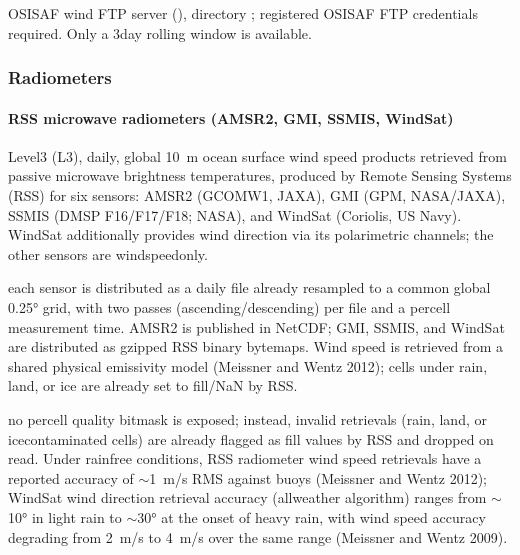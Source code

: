 \documentclass[a4paper,10pt,english]{sphinxmanual}
\begin{document}
\sphinxAtStartPar
{}

\sphinxAtStartPar
OSI\sphinxhyphen{}SAF wind FTP server (), directory ; registered OSI\sphinxhyphen{}SAF FTP credentials required. Only a 3\sphinxhyphen{}day rolling window is available.


\subsubsection{Radiometers}
\label{\detokenize{05_reference_datasets:radiometers}}

\paragraph{RSS microwave radiometers (AMSR2, GMI, SSMIS, WindSat)}
\label{\detokenize{05_reference_datasets:rss-microwave-radiometers-amsr2-gmi-ssmis-windsat}}
\sphinxAtStartPar
{}

\sphinxAtStartPar
Level\sphinxhyphen{}3 (L3), daily, global 10 m ocean surface wind speed products retrieved from passive microwave brightness temperatures, produced by Remote Sensing Systems (RSS) for six sensors: AMSR2 (GCOM\sphinxhyphen{}W1, JAXA), GMI (GPM, NASA/JAXA), SSMIS (DMSP F16/F17/F18; NASA), and WindSat (Coriolis, US Navy). WindSat additionally provides wind direction via its polarimetric channels; the other sensors are wind\sphinxhyphen{}speed\sphinxhyphen{}only.

\sphinxAtStartPar
{}

\sphinxAtStartPar
each sensor is distributed as a daily file already resampled to a common global 0.25° grid, with two passes (ascending/descending) per file and a per\sphinxhyphen{}cell measurement time. AMSR2 is published in NetCDF; GMI, SSMIS, and WindSat are distributed as gzipped RSS binary bytemaps. Wind speed is retrieved from a shared physical emissivity model (Meissner and Wentz 2012); cells under rain, land, or ice are already set to fill/NaN by RSS.

\sphinxAtStartPar
{}

\sphinxAtStartPar
no per\sphinxhyphen{}cell quality bitmask is exposed; instead, invalid retrievals (rain\sphinxhyphen{}, land\sphinxhyphen{}, or ice\sphinxhyphen{}contaminated cells) are already flagged as fill values by RSS and dropped on read. Under rain\sphinxhyphen{}free conditions, RSS radiometer wind speed retrievals have a reported accuracy of \(\sim\)1 m/s RMS against buoys (Meissner and Wentz 2012); WindSat wind direction retrieval accuracy (all\sphinxhyphen{}weather algorithm) ranges from \(\sim\)10° in light rain to \(\sim\)30° at the onset of heavy rain, with wind speed accuracy degrading from 2 m/s to 4 m/s over the same range (Meissner and Wentz 2009).
\end{document}
